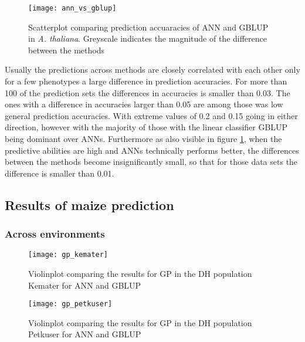 \begin{figure}[H]
  \centering
  \texttt{[image: ann\_vs\_gblup]}
  \decoRule
  \caption[Scatterplot comparing prediction accuaracies of ANN and GBLUP in
  \textit{A. thaliana}]{Scatterplot comparing prediction accuaracies of ANN and GBLUP in
    \textit{A. thaliana}. Greyscale indicates the magnitude of the difference between the
    methods}
\label{fig:annblup}
\end{figure}

Usually the predictions across methods are closely correlated with each other only for a
few phenotypes a large difference in prediction accuracies. For more than 100 of the
prediction sets the differences in accuracies is smaller than 0.03. The ones with a
difference in accuracies larger than 0.05 are among those was low general prediction
accuracies. With extreme values of 0.2 and 0.15 going in either direction, however with
the majority of those with the linear classifier GBLUP being dominant over
ANNs. Furthermore as also visible in figure \ref{fig:annblup}, when the predictive
abilities are high and ANNs technically performs better, the differences between the
methods become insignificantly small, so that for those data sets the difference is
smaller than 0.01.

\subsection{Results of maize prediction}
\subsubsection{Across environments}

\begin{figure}[H]
 \centering \texttt{[image: gp\_kemater]}
 \decoRule
 \caption[Violinplot comparing the results for GP in the DH population Kemater for ANN and
 GBLUP]{Violinplot comparing the results for GP in the DH population Kemater for ANN and
   GBLUP }
\label{fig:ke_ann}
\end{figure}

\begin{figure}[H]
 \centering \texttt{[image: gp\_petkuser]}
 \decoRule
 \caption[Violinplot comparing the results for GP in the DH population Petkuser for ANN and GBLUP]{Violinplot comparing the results for GP in the DH population Petkuser for ANN and GBLUP }
\label{fig:pe_ann}
\end{figure}


